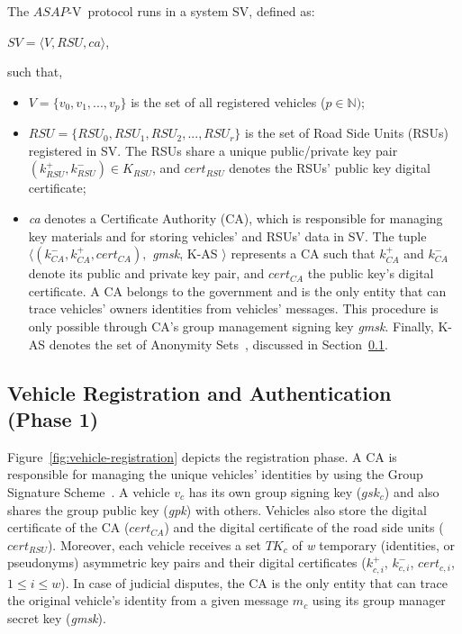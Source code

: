 \documentclass[preprint,12pt]{elsarticle}
\newcommand{\protocolname}{$ASAP$-V}
\begin{document}
The \protocolname~protocol runs in a system SV, defined as:

\begin{center}
$SV = \langle V, RSU, ca \rangle$,
\end{center}

\noindent
such that,

\begin{itemize}
	\item  $V = \{v_{0}, v_{1}, ..., v_{p}\}$ is the set of all registered vehicles ($p \in \mathbb{N})$;
	
	\item $RSU = \{RSU_{0}, RSU_{1}, RSU_{2}, ..., RSU_{r}\}$ is the set of Road Side Units (RSUs) registered in SV. The RSUs share a unique public/private key pair $(k^{+}_{RSU}, k^{-}_{RSU}) \in K_{RSU}$, and $cert_{RSU}$ denotes the RSUs' public key digital certificate;
	
	\item \textit{ca} denotes a Certificate Authority (CA), which is responsible for managing key materials and for storing vehicles' and RSUs' data in SV. The tuple $\langle (k^{-}_{CA}, k^{+}_{CA}, cert_{CA}),$ \textit{gmsk}, K-AS $\rangle$ represents a CA such that $k^{+}_{CA}$ and $k^{-}_{CA}$ denote its public and private key pair, and $cert_{CA}$ the public key's digital certificate. A CA belongs to the government and is the only entity that can trace vehicles' owners identities from vehicles' messages. This procedure is only possible through CA's group management signing key \textit{gmsk}. Finally, K-AS denotes the set of Anonymity Sets~\cite{privacytecterminology1}, discussed in Section~\ref{sec:phase1}.
\end{itemize}

\subsection{Vehicle Registration and Authentication (Phase 1)}
\label{sec:phase1}
Figure~\ref{fig:vehicle-registration} depicts the registration phase. A CA is responsible for managing the unique vehicles' identities by using the Group Signature Scheme~\cite{group-sign}. A vehicle $v_{c}$  has its own group signing key ($gsk_{c}$) and also shares the group public key (\textit{gpk}) with others. Vehicles also store the digital certificate of the CA ($cert_{CA}$) and the digital certificate of the road side units ($cert_{RSU}$). Moreover, each vehicle receives a set $TK_{c}$ of \textit{w} temporary (identities, or pseudonyms) asymmetric key pairs and their digital certificates ($k^{+}_{c,i}$, $k^{-}_{c,i}$, $cert_{c,i}$, $1 \le i \le w$). In case of judicial disputes, the CA is the only entity that can trace the original vehicle's identity from a given message $m_{c}$ using its group manager secret key (\textit{gmsk}).
\end{document}
